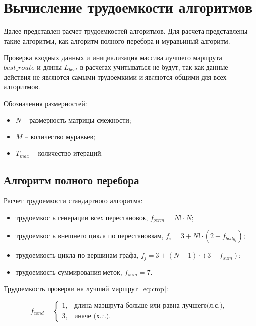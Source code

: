 \section{Вычисление трудоемкости алгоритмов}

Далее представлен расчет трудоемкостей алгоритмов.
Для расчета представлены такие алгоритмы, как алгоритм полного перебора и муравьиный алгоритм.

Проверка входных данных и инициализация массива лучшего маршрута $best\_route$ и длины $L_{best}$ в расчетах учитываться не будут, так как данные действия не являются самыми трудоемкими и являются общими для всех алгоритмов.

Обозначения размерностей:

\begin{itemize}
    \item $N$ -- размерность матрицы смежности;
    \item $M$ -- количество муравьев;
    \item $T_{max}$ -- количество итераций.
\end{itemize}

\subsection{Алгоритм полного перебора}

Расчет трудоемкости стандартного алгоритма:

\begin{itemize}
    \item трудоемкость генерации всех перестановок, $f_{perm} = N! \cdot N$;
    \item трудоемкость внешнего цикла по перестановкам, $f_{i} = 3 + N! \cdot (2 + f_{body_{i}})$;
    \item трудоемкость цикла по вершинам графа, $f_{j} = 3 + (N-1) \cdot (3 + f_{sum})$;
    \item трудоемкость суммирования меток, $f_{sum} = 7$.
\end{itemize}

Трудоемкость проверки на лучший маршрут~\ref{eq:cmp}:

\begin{equation}
    \label{eq:cmp}
    f_{cond} =
    \begin{cases}
        1, & \text{длина маршрута больше или равна лучшего(л.с.),}\\
        3, & \text{иначе (х.с.).}
    \end{cases}
\end{equation}

